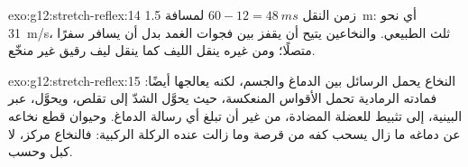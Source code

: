 \begin{solution}{exo:g12:stretch-reflex:14}
زمن النقل $60 - 12 = \qty{48}{ms}$ لمسافة \qty{1.5}{m}: أي نحو
\qty{31}{m/s}، ثلث الطبيعي. والنخاعين يتيح  أن يقفز بين
فجوات الغمد بدل أن يسافر سفرًا متصلًا؛ ومن غيره ينقل الليف كما ينقل ليف
رقيق غير منخّع.
\end{solution}

\begin{solution}{exo:g12:stretch-reflex:15}
النخاع يحمل الرسائل بين الدماغ والجسم، لكنه يعالجها أيضًا: فمادته
الرمادية تحمل  الأقواس المنعكسة، حيث يحوَّل الشدّ إلى تقلص، ويحوَّل،
عبر  البينية، إلى تثبيط للعضلة المضادة، من غير أن تبلغ أي
رسالة الدماغ. وحيوان قطع نخاعه عن دماغه ما زال يسحب كفه من قرصة وما
زالت عنده الركلة الركبية: فالنخاع مركز، لا كبل وحسب.
\end{solution}

